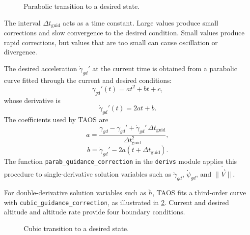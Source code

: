 \begin{figure}[htbp]
  \centering
  
  \caption{Parabolic transition to a desired state.}
  \label{fig:parabolic-guidance-transition}
\end{figure}

The interval $\Delta t_{\mathrm{guid}}$ acts as a time constant. Large values produce
small corrections and slow convergence to the desired condition. Small values
produce rapid corrections, but values that are too small can cause oscillation or
divergence.

The desired acceleration $\dot\gamma_{gd}'$ at the current time is obtained from a
parabolic curve fitted through the current and desired conditions:
\begin{equation}
  \gamma_{gd}'(t)=a t^2+b t+c,
  \label{eq:parabolic-guidance-state}
\end{equation}
whose derivative is
\begin{equation}
  \dot\gamma_{gd}'(t)=2at+b.
  \label{eq:parabolic-guidance-rate}
\end{equation}
The coefficients used by TAOS are
\begin{equation}
  a=\frac{\gamma_{gd}-\gamma_{gd}'
    +\dot\gamma_{gd}'\,\Delta t_{\mathrm{guid}}}
    {\Delta t_{\mathrm{guid}}^2},
  \label{eq:parabolic-guidance-a}
\end{equation}
\begin{equation}
  b=\dot\gamma_{gd}'-2a\left(t+\Delta t_{\mathrm{guid}}\right).
  \label{eq:parabolic-guidance-b}
\end{equation}
The function \nolinkurl{parab_guidance_correction} in the \texttt{derivs} module
applies this procedure to single-derivative solution variables such as
$\dot\gamma_{gd}$, $\dot\psi_{gd}$, and $\lVert\dot{\vec V}\rVert$.


For double-derivative solution variables such as $\ddot h$, TAOS fits a third-order
curve with \nolinkurl{cubic_guidance_correction}, as illustrated in
\cref{fig:cubic-guidance-transition}. Current and desired altitude and altitude rate
provide four boundary conditions.

\begin{figure}[htbp]
  \centering
  
  \caption{Cubic transition to a desired state.}
  \label{fig:cubic-guidance-transition}
\end{figure}


